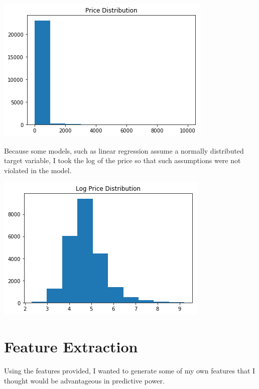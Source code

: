 \documentclass[twocolumn,10pt]{asme2ej}
\begin{document}
\includegraphics[scale=.5]{price.png}

Because some models, such as linear regression assume a normally distributed target variable, I took the log of the price so that such assumptions were not violated in the model.

\includegraphics[scale=.5]{log_price.png}
\section{Feature Extraction}
Using the features provided, I wanted to generate some of my own features that I thought would be advantageous in predictive power.
\end{document}
